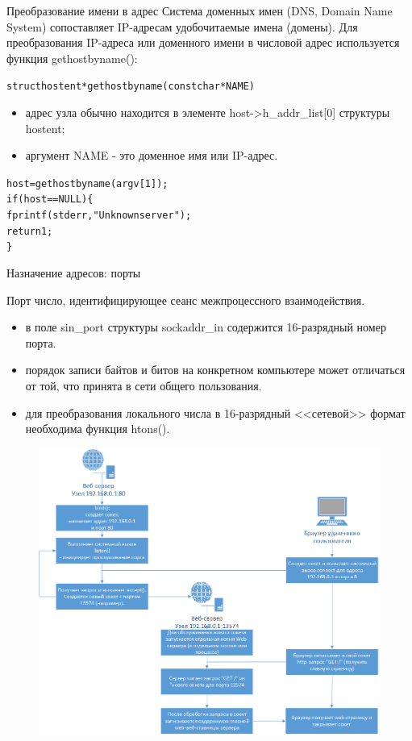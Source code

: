 \documentclass{beamer}
\begin{document}
\begin{frame}[fragile]{Преобразование имени в адрес}
Система доменных имен (DNS, Domain Name System) сопоставляет IP-адресам удобочитаемые имена (домены). Для преобразования IP-адреса или доменного имени в числовой адрес используется функция gethostbyname():
	\begin{alltt}
		struct hostent * gethostbyname (const char * NAME)
	\end{alltt}
	\begin{itemize}
		\item адрес узла обычно находится в элементе host->h\_addr\_list[0] структуры hostent;
		\item аргумент NAME - это доменное имя или IP-адрес.
	\end{itemize}
	\begin{alltt}
		host = gethostbyname (argv[1]);
		if (host == NULL) \{
		    fprintf (stderr, "Unknown server");
		    return 1;
		\}
	\end{alltt}	
\end{frame}

\begin{frame}[fragile]{Назначение адресов: порты}
	\begin{block}{Порт}
		число, идентифицирующее сеанс межпроцессного взаимодействия.
	\end{block}
	\begin{itemize}
		\item в поле sin\_port структуры sockaddr\_in содержится 16-разрядный номер порта.
		\item порядок записи байтов и битов на конкретном компьютере может отличаться от той, что принята в сети общего пользования. 
		\item для преобразования локального числа в 16-разрядный <<сетевой>> формат необходима функция htons().
	\end{itemize}
\end{frame}

\begin{frame}
	\begin{figure}[h]
		\centering
	\includegraphics[scale=0.4]{images/lec12-pic05.png}
	\end{figure}
\end{frame}
\end{document}
